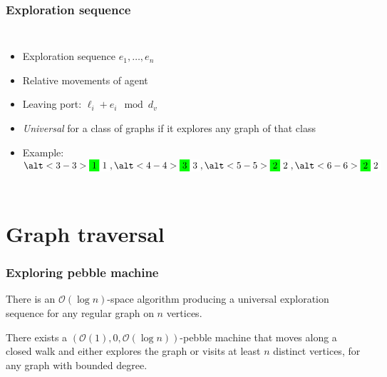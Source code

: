 \documentclass{beamer}
\begin{document}
\begin{frame}
  \frametitle{Exploration sequence}
  \begin{columns}
    \begin{itemize}
      \item Exploration sequence $e_{1},\dots, e_{n}$
      \item Relative movements of agent
      \item Leaving port: $\ell_{i} + e_{i}\mod d_{v}$
      \item \emph{Universal} for a class of graphs if it explores any graph of
        that class
      \item<2->[$\rightarrow$] Example:
        $\alt<3-3>{\colorbox{green}{1}}{\colorbox{white!0}{1}},
        \alt<4-4>{\colorbox{green}{3}}{\colorbox{white!0}{3}},
        \alt<5-5>{\colorbox{green}{2}}{\colorbox{white!0}{2}},
        \alt<6-6>{\colorbox{green}{2}}{\colorbox{white!0}{2}}$
    \end{itemize}
    \begin{center}
      \resizebox{\textwidth}{!}{}
    \end{center}
  \end{columns}
\end{frame}

\section{Graph traversal}
\begin{frame}
  \frametitle{Exploring pebble machine}
  \begin{theorem}[Reingold]
    There is an $\mathcal{O}(\log n)$-space algorithm producing a universal
    exploration sequence for any regular graph on $n$ vertices.
  \end{theorem}
  \begin{center}
  \end{center}
  \begin{theorem}
    There exists a $(\mathcal{O}(1), 0, \mathcal{O}(\log n))$-pebble machine
    that moves along a closed walk and either explores the graph or visits at
    least $n$ distinct vertices, for any graph with bounded degree.
  \end{theorem}
\end{frame}
\end{document}
